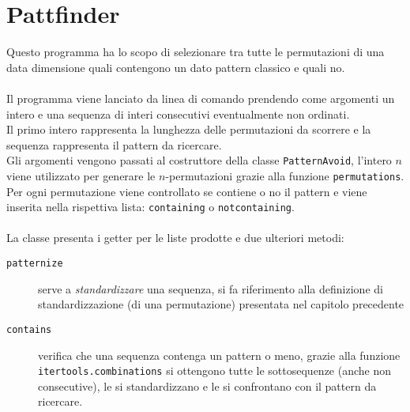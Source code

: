 \section*{Pattfinder}
Questo programma ha lo scopo di selezionare tra tutte le permutazioni di una data dimensione quali contengono un dato pattern classico e quali no.\\\\
Il programma viene lanciato da linea di comando prendendo come argomenti un intero e una sequenza di interi consecutivi eventualmente non ordinati.\\
Il primo intero rappresenta la lunghezza delle permutazioni da scorrere e la sequenza rappresenta il pattern da ricercare.\\
Gli argomenti vengono passati al costruttore della classe \texttt{PatternAvoid}, l'intero $n$ viene utilizzato per generare le $n$-permutazioni grazie alla funzione \texttt{permutations}. Per ogni permutazione viene controllato se contiene o no il pattern e viene inserita nella rispettiva lista: \texttt{containing} o \texttt{notcontaining}.\\\\
La classe presenta i getter per le liste prodotte e due ulteriori metodi: 
\begin{description}
\item[\texttt{patternize}] serve a \textit{standardizzare} una sequenza, si fa riferimento alla definizione di standardizzazione (di una permutazione) presentata nel capitolo precedente
\item[\texttt{contains}] verifica che una sequenza contenga un pattern o meno, grazie alla funzione \texttt{itertools.combinations} si ottengono tutte le sottosequenze (anche non consecutive), le si standardizzano e le si confrontano con il pattern da ricercare.
\end{description}

